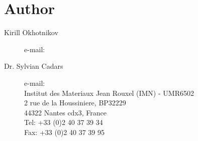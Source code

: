\documentclass[a4paper,english]{article}
\begin{document}
\section{Author}
\begin{description}
\item[Kirill Okhotnikov]
e-mail: 

\item[Dr. Sylvian Cadars] 
e-mail:  \\
Institut des Materiaux Jean Rouxel (IMN) - UMR6502\\
2 rue de la Houssiniere, BP32229\\
44322 Nantes cdx3, France\\
Tel: +33 (0)2 40 37 39 34\\
Fax: +33 (0)2 40 37 39 95
\end{description}

\noindent

\LatexManEnd
\end{document}
